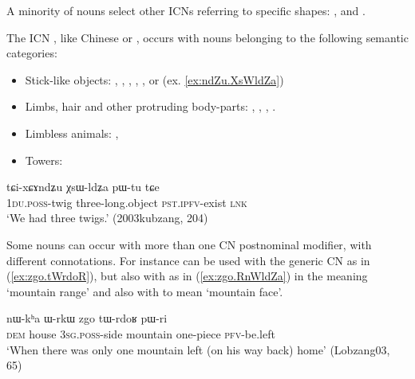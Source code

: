 A minority of nouns select other ICNs referring to specific shapes: ,  and .

 

The ICN , like Chinese  or , occurs with nouns belonging to the following semantic categories:

\begin{itemize}
\item Stick-like objects:  , , , ,  ,     or  (ex. \ref{ex:ndZu.XsWldZa})
\item Limbs, hair and other protruding body-parts: , ,  , .
\item Limbless animals:  ,  
\item Towers: 
\end{itemize} 
\begin{exe}
\ex \label{ex:ndZu.XsWldZa}
\gll  tɕi-xɕɤndʑu χsɯ-ldʑa pɯ-tu tɕe \\
\textsc{1du}.\textsc{poss}-twig three-long.object  \textsc{pst}.\textsc{ipfv}-exist \textsc{lnk} \\
\glt `We had three twigs.'  (2003kubzang, 204)
\end{exe}


Some nouns can occur with more than one CN postnominal modifier, with different connotations. For instance  can be used with the generic CN  as in (\ref{ex:zgo.tWrdoR}), but also with    as in (\ref{ex:zgo.RnWldZa}) in the meaning `mountain range' and also with  to mean `mountain face'.

\begin{exe}
\ex \label{ex:zgo.tWrdoR}
\gll nɯ-kʰa ɯ-rkɯ zgo tɯ-rdoʁ pɯ-ri \\
\textsc{dem} house \textsc{3sg}.\textsc{poss}-side mountain one-piece \textsc{pfv}-be.left  \\
\glt `When there was only one mountain left (on his way back) home' (Lobzang03, 65)
\end{exe}

